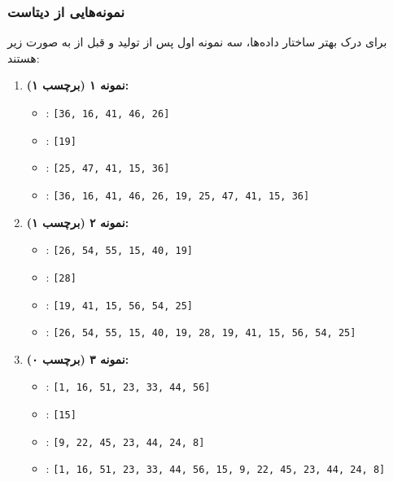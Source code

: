 \documentclass{article}
\begin{document}
\subsubsection{نمونه‌هایی از دیتاست}

برای درک بهتر ساختار داده‌ها، سه نمونه اول پس از تولید و قبل از  به صورت زیر هستند:

\begin{enumerate}
	\item \textbf{نمونه ۱ (برچسب ۱):}
	\begin{LTR}
		\begin{itemize}
			
				\item {}: \texttt{[36, 16, 41, 46, 26]}
				\item {}: \texttt{[19]}
				\item {}: \texttt{[25, 47, 41, 15, 36]} 
				\item {}: \texttt{[36, 16, 41, 46, 26, 19, 25, 47, 41, 15, 36]}
			
		\end{itemize}
	\end{LTR}
	\item \textbf{نمونه ۲ (برچسب ۱):}
	\begin{LTR}
		\begin{itemize}
		
				\item {}: \texttt{[26, 54, 55, 15, 40, 19]}
				\item {}: \texttt{[28]}
				\item {}: \texttt{[19, 41, 15, 56, 54, 25]} 
				\item {}: \texttt{[26, 54, 55, 15, 40, 19, 28, 19, 41, 15, 56, 54, 25]}
				
		\end{itemize}
	\end{LTR}
	\item \textbf{نمونه ۳ (برچسب ۰):}
	\begin{LTR}
		\begin{itemize}
			\item {}: \texttt{[1, 16, 51, 23, 33, 44, 56]}
			\item {}: \texttt{[15]}
			\item {}: \texttt{[9, 22, 45, 23, 44, 24, 8]} 
			\item {}: \texttt{[1, 16, 51, 23, 33, 44, 56, 15, 9, 22, 45, 23, 44, 24, 8]}
		\end{itemize}
	\end{LTR}
\end{enumerate}
\end{document}
